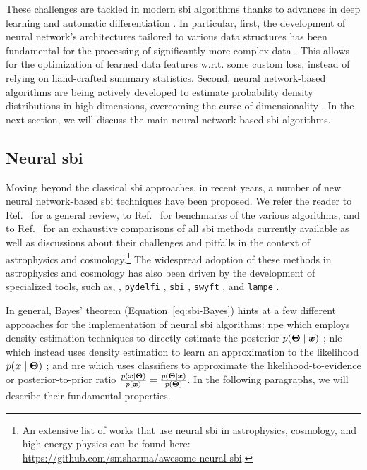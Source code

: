 These challenges are tackled in modern \gls*{sbi} algorithms thanks to advances in deep learning \cite{lecun2015deep} and automatic differentiation \cite{baydin2018automatic}. In particular, first, the development of neural network's architectures tailored to various data structures has been fundamental for the processing of significantly more complex data  \cite{lecun2015deep}. This allows for the optimization of learned data features w.r.t. some custom loss, instead of relying on hand-crafted summary statistics. Second, neural network-based algorithms are being actively developed to estimate probability density distributions in high dimensions, overcoming the curse of dimensionality \cite[\eg][]{papamakarios2019neural, papamakarios2021normalizing, Papamakarios:2016ctj}. In the next section, we will discuss the main neural network-based \gls*{sbi} algorithms. 


\subsection{Neural \gls*{sbi}} \label{subsec:nsbi}

Moving beyond the classical \gls*{sbi} approaches, in recent years, a number of new neural network-based \gls*{sbi} techniques have been proposed. We refer the reader to Ref.~\cite{Cranmer:2019eaq} for a general review, to Ref.~\cite{Lueckmann:2021aa} for benchmarks of the various algorithms, and to Ref.~\cite{Ho:2024whi} for an exhaustive comparisons of all \gls*{sbi} methods currently available as well as discussions about their challenges and pitfalls in the context of astrophysics and cosmology.\footnote{An extensive list of works that use neural \gls*{sbi} in astrophysics, cosmology, and high energy physics can be found here: \url{https://github.com/smsharma/awesome-neural-sbi}.}
The widespread adoption of these methods in astrophysics and cosmology has also been driven by the development of specialized tools, such as, \eg, \texttt{pydelfi} \cite{Alsing:2019xrx}, \texttt{sbi} \cite{tejero-cantero2020sbi}, \texttt{swyft} \cite{Miller2022}, and \texttt{lampe} \cite{lampe}. 

In general, Bayes' theorem (Equation~\eqref{eq:sbi-Bayes}) hints at a few different approaches for the implementation of neural \gls*{sbi} algorithms: \gls*{npe} which employs density estimation techniques to directly estimate the posterior $p(\bm{\Theta}\mid\bm{x})$ \cite{Papamakarios:2016ctj, Greenberg:2019aa}; \gls*{nle} which instead uses density estimation to learn an approximation to the likelihood $p(\bm{x}\mid\bm{\Theta})$ \cite{Papamakarios:2018aa, Durkan:2018aa}; and \gls*{nre} \cite{cranmer2015approximating, gutmann2018likelihood, Hermans:2019ioj, thomas2022likelihood, Miller:2020hua} which uses classifiers to approximate the likelihood-to-evidence or posterior-to-prior ratio $\frac{p(\bm{x}\mid\bm{\Theta})}{p(\bm{x})}=\frac{p(\bm{\Theta}\mid\bm{x})}{p(\bm{\Theta})}$. In the following paragraphs, we will describe their fundamental properties.


